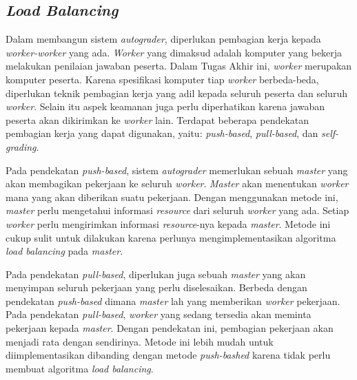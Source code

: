 \subsection{\textit{Load Balancing}}

\par Dalam membangun sistem \textit{autograder}, diperlukan pembagian kerja kepada \textit{worker-worker} yang ada. \textit{Worker} yang dimaksud adalah komputer yang bekerja melakukan penilaian jawaban peserta. Dalam Tugas Akhir ini, \textit{worker} merupakan komputer peserta. Karena spesifikasi komputer tiap \textit{worker} berbeda-beda, diperlukan teknik pembagian kerja yang adil kepada seluruh peserta dan seluruh \textit{worker}. Selain itu aspek keamanan juga perlu diperhatikan karena jawaban peserta akan dikirimkan ke \textit{worker} lain. Terdapat beberapa pendekatan pembagian kerja yang dapat digunakan, yaitu: \textit{push-based}, \textit{pull-based}, dan \textit{self-grading}.

\par Pada pendekatan \textit{push-based}, sistem \textit{autograder} memerlukan sebuah \textit{master} yang akan membagikan pekerjaan ke seluruh \textit{worker}. \textit{Master} akan menentukan \textit{worker} mana yang akan diberikan suatu pekerjaan. Dengan menggunakan metode ini, \textit{master} perlu mengetahui informasi \textit{resource} dari seluruh \textit{worker} yang ada. Setiap \textit{worker} perlu mengirimkan informasi \textit{resource}-nya kepada \textit{master}. Metode ini cukup sulit untuk dilakukan karena perlunya mengimplementasikan algoritma \textit{load balancing} pada \textit{master}.

\par Pada pendekatan \textit{pull-based}, diperlukan juga sebuah \textit{master} yang akan menyimpan seluruh pekerjaan yang perlu diselesaikan. Berbeda dengan pendekatan \textit{push-based} dimana \textit{master} lah yang memberikan \textit{worker} pekerjaan. Pada pendekatan \textit{pull-based}, \textit{worker} yang sedang tersedia akan meminta pekerjaan kepada \textit{master}. Dengan pendekatan ini, pembagian pekerjaan akan menjadi rata dengan sendirinya. Metode ini lebih mudah untuk diimplementasikan dibanding dengan metode \textit{push-bashed} karena tidak perlu membuat algoritma \textit{load balancing}.

